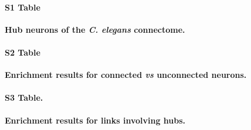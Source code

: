 \documentclass[10pt,letterpaper]{article}
\begin{document}
{%

\clearpage

\paragraph*{S1 Table}
{\bf Hub neurons of the \textit{C. elegans} connectome.}
\paragraph*{S2 Table}
{\bf Enrichment results for connected \textit{vs} unconnected neurons.}
\paragraph*{S3 Table.}
{\bf Enrichment results for links involving hubs.}

}
\end{document}
